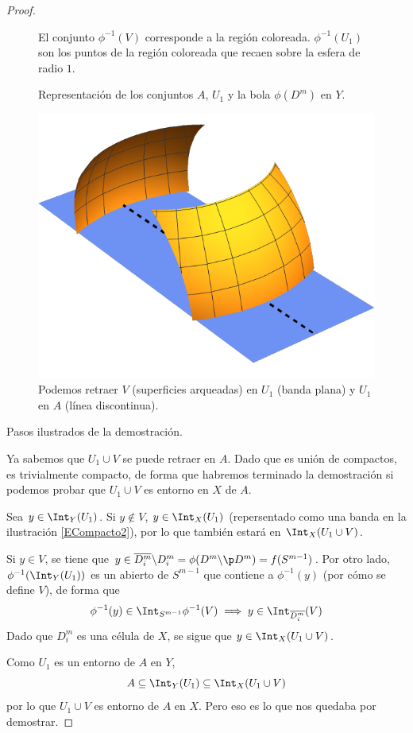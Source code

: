 \begin{proof}
\begin{marginfigure}
\begin{subfigure}[b]{\textwidth}

\caption{ El conjunto $\phi^{-1}(V)$ corresponde a la
región coloreada. $\phi^{-1}(U_1)$ son los puntos de la región coloreada que
recaen sobre la esfera de radio $1$.}
\end{subfigure}
\begin{subfigure}[b]{\textwidth}
%
\caption{Representación de los conjuntos $A$, $U_1$ y la bola $\phi(D^m)$ en $Y$.}
\end{subfigure}
\begin{subfigure}[b]{\textwidth}
\includegraphics{figures/ECompacto2.pdf}
\caption{ Podemos retraer $V$ (superficies arqueadas) en
$U_1$ (banda plana) y $U_1$ en $A$ (línea discontinua).}
\end{subfigure}
\caption{Pasos ilustrados de la demostración.}
\end{marginfigure}

Ya sabemos que $U_1 \cup V$ se puede retraer en $A$. Dado que es unión de
compactos, es trivialmente compacto, de forma que habremos terminado la
demostración si podemos probar que $U_1 \cup V$ es entorno en $X$ de $A$.

Sea $y \in \Int_Y(U_1)$. Si $y \not\in V$, $y \in \Int_X(U_1)$
(repersentado como una banda en la ilustración \ref{ECompacto2}), por lo que
también estará en $\Int_X(U_1 \cup V)$.

Si $y \in V$, se tiene que $y \in \overline{D^m_i}\backslash D^m_i=
\phi(D^m\backslash \p D^m)=f(S^{m-1})$. Por otro lado,
$\phi^{-1}(\Int_Y(U_1))$ es un abierto de $S^{m-1}$ que contiene a
$\phi^{-1}(y)$ (por cómo se define $V$), de forma que 
\[\phi^{-1}(y) \in \Int_{S^{m-1}}\phi^{-1}(V) \implies y \in
\Int_{\overline{D^m_i}}(V)\]
Dado que $D^m_i$ es una célula de $X$, se sigue que $y \in
\Int_X(U_1\cup V)$.

Como $U_1$ es un entorno de $A$ en $Y$,
\[A \subseteq \Int_Y(U_1)\subseteq \Int_X(U_1\cup V)\]
por lo que $U_1\cup V$ es entorno de $A$ en $X$. Pero eso es lo que nos
quedaba por demostrar.
\end{proof}

